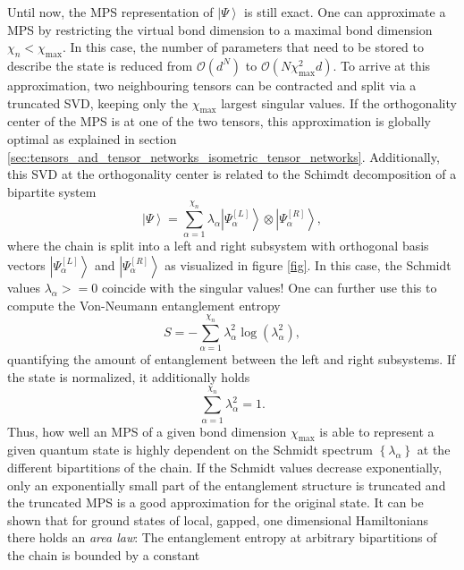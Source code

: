 Until now, the MPS representation of $\left|\Psi\right\rangle$ is still exact. One can approximate a MPS by restricting the virtual bond dimension to a maximal bond dimension $\chi_n < \chi_\text{max}$. In this case, the number of parameters that need to be stored to describe the state is reduced from $\mathcal{O}\left(d^N\right)$ to $\mathcal{O}\left(N\chi_\text{max}^2 d\right)$. To arrive at this approximation, two neighbouring tensors can be contracted and split via a truncated SVD, keeping only the $\chi_\text{max}$ largest singular values. If the orthogonality center of the MPS is at one of the two tensors, this approximation is globally optimal as explained in section \ref{sec:tensors_and_tensor_networks_isometric_tensor_networks}. Additionally, this SVD at the orthogonality center is related to the Schimdt decomposition of a bipartite system
\begin{equation}
	\left|\Psi\right\rangle = \sum_{\alpha=1}^{\chi_n} \lambda_\alpha \left| \Psi^{[L]}_\alpha\right\rangle \otimes \left|\Psi^{[R]}_\alpha\right\rangle,
\end{equation}
where the chain is split into a left and right subsystem with orthogonal basis vectors $\left|\Psi^{[L]}_\alpha\right\rangle$ and $\left|\Psi^{[R]}_\alpha\right\rangle$ as visualized in figure \ref{fig}. In this case, the Schmidt values $\lambda_\alpha >= 0$ coincide with the singular values! One can further use this to compute the Von-Neumann entanglement entropy
\begin{equation}
	S = -\sum_{\alpha=1}^{\chi_n} \lambda_\alpha^2 \log\left(\lambda_\alpha^2\right),
\end{equation}
quantifying the amount of entanglement between the left and right subsystems. If the state is normalized, it additionally holds
\begin{equation}
	\sum_{\alpha=1}^{\chi_n} \lambda_\alpha^2 = 1.
\end{equation}
Thus, how well an MPS of a given bond dimension $\chi_\text{max}$ is able to represent a given quantum state is highly dependent on the Schmidt spectrum $\left\{\lambda_\alpha\right\}$ at the different bipartitions of the chain. If the Schmidt values decrease exponentially, only an exponentially small part of the entanglement structure is truncated and the truncated MPS is a good approximation for the original state. It can be shown \cite{cite:area_law_1D_proof, cite:area_laws_review} that for ground states of local, gapped, one dimensional Hamiltonians there holds an \textit{area law}: The entanglement entropy at arbitrary bipartitions of the chain is bounded by a constant
